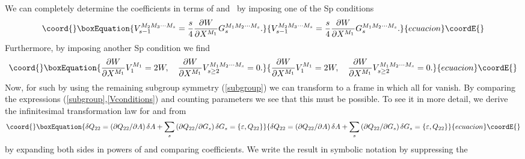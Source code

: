 \documentclass[a4paper,12pt]{article}
\begin{document}
We can completely determine the coefficients \coordHE{}
in terms of \coordHE{} and \coordHE{}\ by imposing one of
the Sp\myHighlight{$\left( 2\right) $}\coordHE{} conditions \coordHE{}
\begin{equation}\coord{}\boxEquation{
V_{s-1}^{M_{2}M_{3}\cdots M_{s}}=\frac{s}{4}\frac{\partial W}{\partial
X^{M_{1}}}G_{s}^{M_{1}M_{2}\cdots M_{s}}.  \label{vsm1}
}{
V_{s-1}^{M_{2}M_{3}\cdots M_{s}}=\frac{s}{4}\frac{\partial W}{\partial
X^{M_{1}}}G_{s}^{M_{1}M_{2}\cdots M_{s}}.  }{ecuacion}\coordE{}\end{equation}
Furthermore, by imposing another Sp\myHighlight{$\left( 2\right) $}\coordHE{} condition \coordHE{} we find
\begin{equation}\coord{}\boxEquation{
\frac{\partial W}{\partial X^{M_{1}}}V_{1}^{M_{1}}=2W,\quad \frac{\partial W
}{\partial X^{M_{1}}}V_{s\geq 2}^{M_{1}M_{2}\cdots M_{s}}=0.
\label{Vconditions}
}{
\frac{\partial W}{\partial X^{M_{1}}}V_{1}^{M_{1}}=2W,\quad \frac{\partial W
}{\partial X^{M_{1}}}V_{s\geq 2}^{M_{1}M_{2}\cdots M_{s}}=0.
}{ecuacion}\coordE{}\end{equation}
Now, for such \coordHE{} by using the remaining
subgroup symmetry (\ref{subgroup}) we can transform to a frame in which all \coordHE{} for \coordHE{} vanish. By comparing the
expressions (\ref{subgroup},\ref{Vconditions}) and counting parameters we
see that this must be possible. To see it in more detail, we derive the
infinitesimal transformation law for \coordHE{} and \coordHE{} from
\begin{equation}\coord{}\boxEquation{
\delta Q_{22}=\left( \partial Q_{22}/\partial A\right) \delta
A+\sum_{s}\left( \partial Q_{22}/\partial G_{s}\right) \delta G_{s}=\left\{
\varepsilon ,Q_{22}\right\}   \label{deltaQ22}
}{
\delta Q_{22}=\left( \partial Q_{22}/\partial A\right) \delta
A+\sum_{s}\left( \partial Q_{22}/\partial G_{s}\right) \delta G_{s}=\left\{
\varepsilon ,Q_{22}\right\}   }{ecuacion}\coordE{}\end{equation}
by expanding both sides in powers of \coordHE{} and comparing
coefficients. We write the result in symbolic notation by suppressing the
\end{document}

